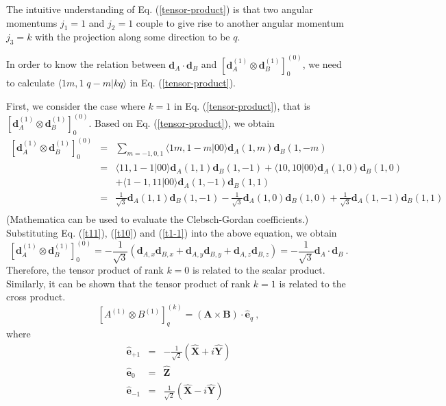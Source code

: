 The intuitive understanding of Eq. (\ref{tensor-product}) is that two angular momentums $j_{1} =1$ and $j_{2}=1$ couple to give rise to another angular momentum $j_{3}=k$ with the projection along some direction to be $q$. 

In order to know the relation between $\mathbf{d}_{A}\cdot\mathbf{d}_{B}$ and $\left[ \mathbf{d}_{A}^{(1)} \otimes \mathbf{d}_{B}^{(1)} \right]_{0}^{(0)}$, we need to calculate $\langle 1m, 1\;q-m | kq \rangle$ in Eq. (\ref{tensor-product}).

First, we consider the case where $k=1$ in Eq. (\ref{tensor-product}), that is $\left[ \mathbf{d}_{A}^{(1)} \otimes \mathbf{d}_{B}^{(1)} \right]_{0}^{(0)}$. Based on Eq. (\ref{tensor-product}), we obtain
\begin{eqnarray}
\left[ \mathbf{d}_{A}^{(1)} \otimes \mathbf{d}_{B}^{(1)} \right]_{0}^{(0)} & = & \sum_{m=-1,0,1} \langle 1 m, 1 -m | 00\rangle \mathbf{d}_{A}(1, m) \mathbf{d}_{B}(1, -m) \nonumber \\
&=& \langle 1 1, 1 -1 | 00\rangle \mathbf{d}_{A}(1, 1) \mathbf{d}_{B}(1, -1) + \langle 1 0, 1 0 | 00\rangle \mathbf{d}_{A}(1, 0) \mathbf{d}_{B}(1, 0) \nonumber \\
&  & + \langle 1 -1, 1 1 | 00\rangle \mathbf{d}_{A}(1, -1) \mathbf{d}_{B}(1, 1) \nonumber \\
&=&\frac{1}{\sqrt{3}} \mathbf{d}_{A}(1, 1) \mathbf{d}_{B}(1, -1) - \frac{1}{\sqrt{3}}\mathbf{d}_{A}(1, 0) \mathbf{d}_{B}(1, 0) +  \frac{1}{\sqrt{3}} \mathbf{d}_{A}(1, -1) \mathbf{d}_{B}(1, 1) \nonumber \\
\end{eqnarray}
(Mathematica can be used to evaluate the Clebsch-Gordan coefficients.)
Substituting Eq. (\ref{t11}), (\ref{t10}) and (\ref{t1-1}) into the above equation, we obtain
\begin{equation}
\left[ \mathbf{d}_{A}^{(1)} \otimes \mathbf{d}_{B}^{(1)} \right]_{0}^{(0)}  = -\frac{1}{\sqrt{3}} (\mathbf{d}_{A,x}\mathbf{d}_{B,x} + \mathbf{d}_{A,y}\mathbf{d}_{B,y} + \mathbf{d}_{A,z}\mathbf{d}_{B,z}) = -\frac{1}{\sqrt{3}} \mathbf{d}_{A}\cdot\mathbf{d}_{B} \ .
\end{equation}
Therefore, the tensor product of rank $k=0$ is related to the scalar product. Similarly, it can be shown that the tensor product of rank $k=1$ is related to the cross product. 
\begin{equation}
\left[ A^{(1)} \otimes B^{(1)} \right]_{q}^{(k)} = (\mathbf{A}\times \mathbf{B})\cdot \mathbf{\hat{e}}_{q} \ ,
\end{equation}
where
\begin{eqnarray}
\mathbf{\hat{e}}_{+1} &=& -\frac{1}{\sqrt{2}}(\mathbf{\hat{X}} + i \mathbf{\hat{Y}}) \nonumber \\
\mathbf{\hat{e}}_{0} &=& \mathbf{\hat{Z}} \nonumber \\
\mathbf{\hat{e}}_{-1} &=& \frac{1}{\sqrt{2}}(\mathbf{\hat{X}} - i \mathbf{\hat{Y}})
\end{eqnarray}


